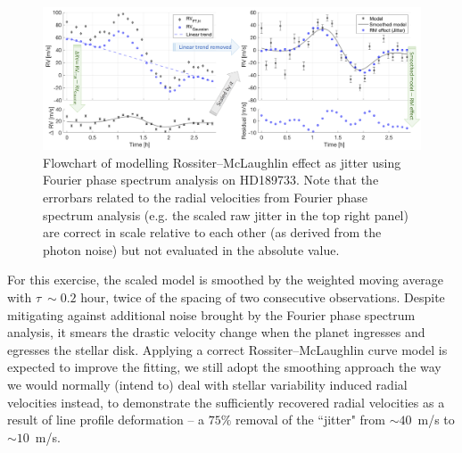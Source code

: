 \begin{figure}[tbp]
\centering
\includegraphics[width = 1.0 \linewidth]
{./Figures/Methods/HD189733.png}
\caption[HD189733: modelling Rossiter–McLaughlin effect as jitter]
		{Flowchart of modelling Rossiter–McLaughlin effect as jitter using Fourier phase spectrum analysis on HD189733. Note that the errorbars related to the radial velocities from Fourier phase spectrum analysis (e.g. the scaled raw jitter in the top right panel) are correct in scale relative to each other (as derived from the photon noise) but not evaluated in the absolute value.}
\label{fig:HD189733}
\end{figure} 

For this exercise, the scaled model is smoothed by the weighted moving average with $\tau~\sim0.2$ hour, twice of the spacing of two consecutive observations. Despite mitigating against additional noise brought by the Fourier phase spectrum analysis, it smears the drastic velocity change when the planet ingresses and egresses the stellar disk. Applying a correct Rossiter–McLaughlin curve model is expected to improve the fitting, we still adopt the smoothing approach the way we would normally (intend to) deal with stellar variability induced radial velocities instead, to demonstrate the sufficiently recovered radial velocities as a result of line profile deformation -- a $75\%$ removal of the ``jitter" from $\sim 40$~m/s to $\sim 10$~m/s. 

%
%


